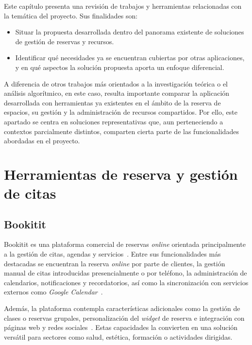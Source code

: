 
Este capítulo presenta una revisión de trabajos y herramientas relacionadas con la temática del proyecto. Sus finalidades son: 
\begin{itemize}
	\item Situar la propuesta desarrollada dentro del panorama existente de soluciones de gestión de reservas y recursos.
	\item Identificar qué necesidades ya se encuentran cubiertas por otras aplicaciones, y en qué aspectos la solución propuesta aporta un enfoque diferencial.
\end{itemize}

A diferencia de otros trabajos más orientados a la investigación teórica o el análisis algorítmico, en este caso, resulta importante comparar la aplicación desarrollada con herramientas ya existentes en el ámbito de la reserva de espacios, su gestión y la administración de recursos compartidos. Por ello, este apartado se centra en soluciones representativas que, aun perteneciendo a contextos parcialmente distintos, comparten cierta parte de las funcionalidades abordadas en el proyecto.

\section{Herramientas de reserva y gestión de citas}
\subsection{Bookitit}
Bookitit es una plataforma comercial de reservas \textit{online} orientada principalmente a la gestión de citas, agendas y servicios~\cite{bookitit:web}. Entre sus funcionalidades más destacadas se encuentran la reserva \textit{online} por parte de clientes, la gestión manual de citas introducidas presencialmente o por teléfono, la administración de calendarios, notificaciones y recordatorios, así como la sincronización con servicios externos como \textit{Google Calendar}~\cite{bookitit:web,bookitit:kitdigital}.

Además, la plataforma contempla características adicionales como la gestión de clases o reservas grupales, personalización del \textit{widget} de reserva e integración con páginas web y redes sociales~\cite{bookitit:web,bookitit:grupales}. Estas capacidades la convierten en una solución versátil para sectores como salud, estética, formación o actividades dirigidas.

